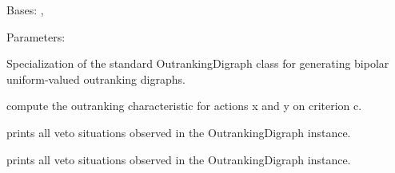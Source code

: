 \documentclass[letterpaper,10pt,english]{sphinxmanual}
\begin{document}
\begin{fulllineitems}
\label{techDoc:outrankingDigraphs.Electre3OutrankingDigraph}
Bases: {\hyperref[techDoc:outrankingDigraphs.OutrankingDigraph]{}}, {\hyperref[techDoc:perfTabs.PerformanceTableau]{}}
\begin{description}
\item[{Parameters:}] \leavevmode
{}

\end{description}

Specialization of the standard OutrankingDigraph class for generating
bipolar uniform-valued outranking digraphs.

\begin{fulllineitems}
\label{techDoc:outrankingDigraphs.Electre3OutrankingDigraph.computeCriterionRelation}
compute the outranking characteristic for actions x and y
on criterion c.

\end{fulllineitems}


\begin{fulllineitems}
\label{techDoc:outrankingDigraphs.Electre3OutrankingDigraph.computeVetos}
prints all veto situations observed in the OutrankingDigraph instance.

\end{fulllineitems}


\begin{fulllineitems}
\label{techDoc:outrankingDigraphs.Electre3OutrankingDigraph.showVetos}
prints all veto situations observed in the OutrankingDigraph instance.

\end{fulllineitems}


\end{fulllineitems}
\end{document}
